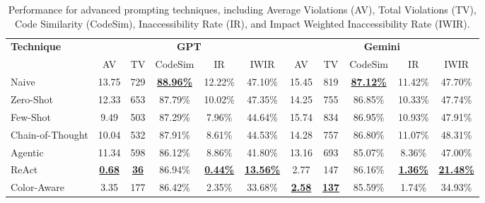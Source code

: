 \begin{table}[htbp]
  \centering
  \small
  \setlength{\tabcolsep}{2pt}
  \begin{tabular}{l
                ccccc            %
                @{\hspace{10pt}} %
                ccccc}
    \toprule
    \multirow{2}{*}{\textbf{Technique}} &
      \multicolumn{5}{c}{\textbf{GPT}} &
      \multicolumn{5}{c}{\textbf{Gemini}} \\
    \cmidrule(lr){2-6}\cmidrule(l){7-11}
      & AV & TV & CodeSim & IR & IWIR
      & AV & TV & CodeSim & IR & IWIR \\
    \midrule
    Naive               & 13.75 & 729 & \underline{\textbf{88.96\%}} & 12.22\% & 47.10\%
                        & 15.45 & 819 & \underline{\textbf{87.12\%}} & 11.42\% & 47.70\% \\
    Zero-Shot           & 12.33 & 653 & 87.79\% & 10.02\% & 47.35\%
                        & 14.25 & 755 & 86.85\% & 10.33\% & 47.74\% \\
    Few-Shot            &  9.49 & 503 & 87.29\% & 7.96\% & 44.64\%
                        & 15.74 & 834 & 86.95\% & 10.93\% & 47.91\% \\
    Chain-of-Thought    & 10.04 & 532 & 87.91\% & 8.61\% & 44.53\%
                        & 14.28 & 757 & 86.80\% & 11.07\% & 48.31\% \\
    Agentic             & 11.34 & 598 & 86.12\% & 8.86\% & 41.80\%
                        & 13.16 & 693 & 85.07\% & 8.36\% & 47.00\% \\
    ReAct               & \underline{\textbf{0.68}} & \underline{\textbf{36}} & 86.94\% & \underline{\textbf{0.44\%}} & \underline{\textbf{13.56\%}}
                        & 2.77 & 147 & 86.16\% & \underline{\textbf{1.36\%}} & \underline{\textbf{21.48\%}} \\
    Color-Aware         & 3.35 & 177 & 86.42\% & 2.35\% & 33.68\%
                        & \underline{\textbf{2.58}} & \underline{\textbf{137}} & 85.59\% & 1.74\% & 34.93\% \\

    \bottomrule
  \end{tabular}
  \caption{Performance for advanced prompting techniques, including Average Violations (AV),
  Total Violations (TV), Code Similarity (CodeSim), Inaccessibility Rate (IR), and Impact Weighted Inaccessibility Rate (IWIR).}
  \label{tab:access-viol-models}
\end{table}
